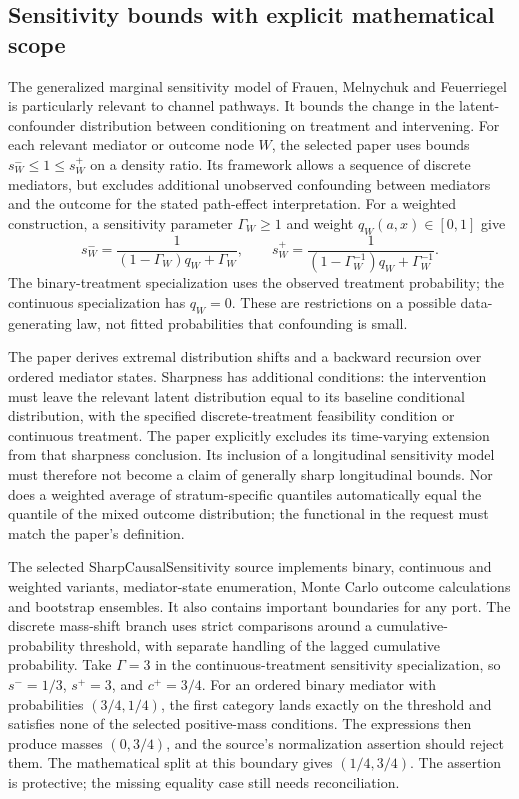 \subsection{Sensitivity bounds with explicit mathematical scope}
The generalized marginal sensitivity model of Frauen, Melnychuk and Feuerriegel is particularly relevant to channel pathways. It bounds the change in the latent-confounder distribution between conditioning on treatment and intervening. For each relevant mediator or outcome node $W$, the selected paper uses bounds $s_W^-\leq1\leq s_W^+$ on a density ratio. Its framework allows a sequence of discrete mediators, but excludes additional unobserved confounding between mediators and the outcome for the stated path-effect interpretation. For a weighted construction, a sensitivity parameter $\Gamma_W\geq1$ and weight $q_W(a,x)\in[0,1]$ give
\[
 s_W^-=\frac{1}{(1-\Gamma_W)q_W+\Gamma_W},\qquad
 s_W^+=\frac{1}{(1-\Gamma_W^{-1})q_W+\Gamma_W^{-1}}.
\]
The binary-treatment specialization uses the observed treatment probability; the continuous specialization has $q_W=0$. These are restrictions on a possible data-generating law, not fitted probabilities that confounding is small. \citep{exec25_pymed_sharp_paper}

The paper derives extremal distribution shifts and a backward recursion over ordered mediator states. Sharpness has additional conditions: the intervention must leave the relevant latent distribution equal to its baseline conditional distribution, with the specified discrete-treatment feasibility condition or continuous treatment. The paper explicitly excludes its time-varying extension from that sharpness conclusion. Its inclusion of a longitudinal sensitivity model must therefore not become a claim of generally sharp longitudinal bounds. Nor does a weighted average of stratum-specific quantiles automatically equal the quantile of the mixed outcome distribution; the functional in the request must match the paper's definition. \citep{exec25_pymed_sharp_paper}

The selected SharpCausalSensitivity source implements binary, continuous and weighted variants, mediator-state enumeration, Monte Carlo outcome calculations and bootstrap ensembles. It also contains important boundaries for any port. The discrete mass-shift branch uses strict comparisons around a cumulative-probability threshold, with separate handling of the lagged cumulative probability. Take $\Gamma=3$ in the continuous-treatment sensitivity specialization, so $s^-=1/3$, $s^+=3$, and $c^+=3/4$. For an ordered binary mediator with probabilities $(3/4,1/4)$, the first category lands exactly on the threshold and satisfies none of the selected positive-mass conditions. The expressions then produce masses $(0,3/4)$, and the source's normalization assertion should reject them. The mathematical split at this boundary gives $(1/4,3/4)$. The assertion is protective; the missing equality case still needs reconciliation. \citep{exec25_pymed_sharp,exec25_pymed_choice}

